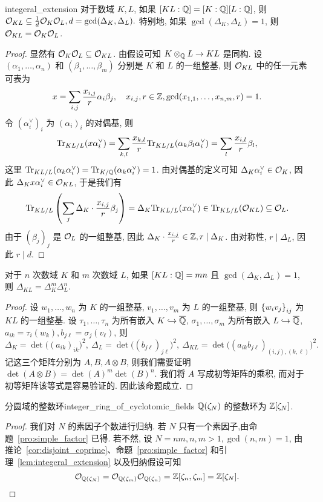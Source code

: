 \begin{lemma}{}{integeral_extension}
对于数域 $K, L$, 如果 $[KL:{\mathbb{Q}}]=[K:{\mathbb{Q}}][L:{\mathbb{Q}}]$, 则 ${\mathcal{O}}_{KL}\subseteq \frac{1}{d}{\mathcal{O}}_K{\mathcal{O}}_L, d=\gcd(\Delta_K,\Delta_L).$ 特别地, 如果 $\gcd(\Delta_K,\Delta_L)=1$, 则 ${\mathcal{O}}_{KL}={\mathcal{O}}_K{\mathcal{O}}_L$.
\end{lemma}
\begin{proof}
显然有 ${\mathcal{O}}_K{\mathcal{O}}_L\subseteq {\mathcal{O}}_{KL}$.
由假设可知 $K\otimes_{\mathbb{Q}} L\to KL$ 是同构. 设 $(\alpha_1,\dots,\alpha_n)$ 和 $(\beta_1,\dots,\beta_m)$ 分别是 $K$ 和 $L$ 的一组整基, 则 ${\mathcal{O}}_{KL}$ 中的任一元素可表为
	\[x=\sum_{i,j}\frac{x_{i,j}}{r}\alpha_i\beta_j,\quad x_{i,j},r\in{\mathbb{Z}}, \gcd(x_{1,1},\dots,x_{n,m},r)=1.\]
令 $(\alpha_i^\vee)_i$ 为 $(\alpha_i)_i$ 的对偶基, 则
	\[{\mathrm{Tr}}_{KL/L}(x\alpha_i^\vee)=\sum_{k,l}\frac{x_{k,l}}{r}{\mathrm{Tr}}_{KL/L}(\alpha_k\beta_l\alpha_i^\vee)
		=\sum_l \frac{x_{i,l}}{r}\beta_l,\]
这里 ${\mathrm{Tr}}_{KL/L}(\alpha_k\alpha_i^\vee)={\mathrm{Tr}}_{K/{\mathbb{Q}}}(\alpha_k\alpha_i^\vee)=1$.
由对偶基的定义可知 $\Delta_K\alpha_i^\vee\in{\mathcal{O}}_K$, 因此 $\Delta_Kx\alpha_i^\vee\in{\mathcal{O}}_{KL}$, 于是我们有
	\[{\mathrm{Tr}}_{KL/L}\left(\sum_j\Delta_K\cdot \frac{x_{i,j}}{r}\beta_j\right)=\Delta_K{\mathrm{Tr}}_{KL/L}(x\alpha_i^\vee)\in{\mathrm{Tr}}_{KL/L}({\mathcal{O}}_{KL})\subseteq{\mathcal{O}}_L.\]
由于 $(\beta_j)_j$ 是 ${\mathcal{O}}_L$ 的一组整基, 因此 $\Delta_K\cdot \frac{x_{i,j}}{r}\in{\mathbb{Z}}, r\mid \Delta_K$. 由对称性, $r\mid \Delta_L$, 因此 $r\mid d$.
\end{proof}

\begin{corollary}{}{}
对于 $n$ 次数域 $K$ 和 $m$ 次数域 $L$, 如果 $[KL:{\mathbb{Q}}]=mn$ 且 $\gcd(\Delta_K,\Delta_L)=1$, 则 $\Delta_{KL}=\Delta_K^m\Delta_L^n$.
\end{corollary}
\begin{proof}
设 $w_1,\dots,w_n$ 为 $K$ 的一组整基, $v_1,\dots,v_m$ 为 $L$ 的一组整基, 则 $\left\{w_iv_j\right\}_{ij}$ 为 $KL$ 的一组整基. 设 $\tau_1,\dots,\tau_n$ 为所有嵌入 $K\hookrightarrow\overline{{\mathbb{Q}}}$, $\sigma_1,\dots,\sigma_m$ 为所有嵌入 $L\hookrightarrow\overline{{\mathbb{Q}}}$, $a_{ik}=\tau_i(w_k),b_{j\ell}=\sigma_j(v_\ell)$, 则
	\[\Delta_K=\det\bigl((a_{ik})_{ik}\bigr)^2,\ 
		\Delta_L=\det\bigl((b_{j\ell})_{j\ell}\bigr)^2,\ 
		\Delta_{KL}=\det\bigl((a_{ik}b_{j\ell})_{(i,j),(k,\ell)}\bigr)^2.\]
记这三个矩阵分别为 $A,B,A\otimes B$, 则我们需要证明 $\det(A\otimes B)=\det(A)^m\det(B)^n$. 我们将 $A$ 写成初等矩阵的乘积, 而对于初等矩阵该等式是容易验证的. 因此该命题成立.
\end{proof}



\begin{theorem}{分圆域的整数环}{integer_ring_of_cyclotomic_fields}
${\mathbb{Q}}(\zeta_N)$ 的整数环为 ${\mathbb{Z}}[\zeta_N]$.
\end{theorem}
\begin{proof}
我们对 $N$ 的素因子个数进行归纳. 若 $N$ 只有一个素因子,由命题~\ref{pro:simple_factor} 已得. 若不然, 设 $N=nm,n,m>1,\gcd(n,m)=1$, 由推论~\ref{cor:disjoint_coprime}、命题~\ref{pro:simple_factor} 和引理~\ref{lem:integeral_extension} 以及归纳假设可知
\[{\mathcal{O}}_{{\mathbb{Q}}(\zeta_N)}={\mathcal{O}}_{{\mathbb{Q}}(\zeta_m)}{\mathcal{O}}_{{\mathbb{Q}}(\zeta_n)}={\mathbb{Z}}[\zeta_n,\zeta_m]={\mathbb{Z}}[\zeta_N].\]
\end{proof}

